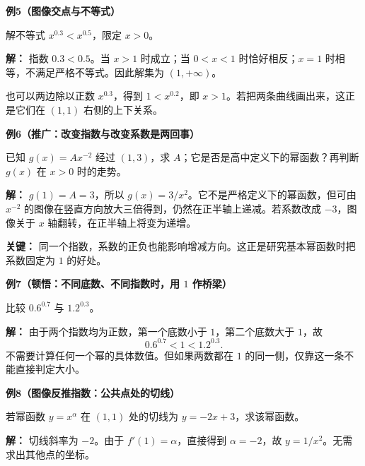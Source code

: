 \clearpage
\begin{examplebox}
\textbf{\textcolor{CExample}{例5（图像交点与不等式）}}



  解不等式 $x^{0.3}<x^{0.5}$，限定 $x>0$。

  \textbf{解：} 指数 $0.3<0.5$。当 $x>1$ 时成立；当 $0<x<1$ 时恰好相反；$x=1$ 时相等，不满足严格不等式。因此解集为 $(1,+\infty)$。

  也可以两边除以正数 $x^{0.3}$，得到 $1<x^{0.2}$，即 $x>1$。若把两条曲线画出来，这正是它们在 $(1,1)$ 右侧的上下关系。

  \medskip
  
\end{examplebox}
\clearpage
\begin{examplebox}
\textbf{\textcolor{CExample}{例6（推广：改变指数与改变系数是两回事）}}



  已知 $g(x)=Ax^{-2}$ 经过 $(1,3)$，求 $A$；它是否是高中定义下的幂函数？再判断 $g(x)$ 在 $x>0$ 时的走势。

  \textbf{解：} $g(1)=A=3$，所以 $g(x)=3/x^2$。它不是严格定义下的幂函数，但可由 $x^{-2}$ 的图像在竖直方向放大三倍得到，仍然在正半轴上递减。若系数改成 $-3$，图像关于 $x$ 轴翻转，在正半轴上将变为递增。

  \textbf{关键：} 同一个指数，系数的正负也能影响增减方向。这正是研究基本幂函数时把系数固定为 $1$ 的好处。

  \medskip
  
\end{examplebox}
\clearpage
\begin{examplebox}
\textbf{\textcolor{CExample}{例7（顿悟：不同底数、不同指数时，用 $1$ 作桥梁）}}



  比较 $0.6^{0.7}$ 与 $1.2^{0.3}$。

  \textbf{解：} 由于两个指数均为正数，第一个底数小于 $1$，第二个底数大于 $1$，故
  \[
      0.6^{0.7}<1<1.2^{0.3}.
  \]
  不需要计算任何一个幂的具体数值。但如果两数都在 $1$ 的同一侧，仅靠这一条不能直接判定大小。
  \medskip
  
\end{examplebox}
\clearpage
\begin{examplebox}
\textbf{\textcolor{CExample}{例8（图像反推指数：公共点处的切线）}}



  若幂函数 $y=x^\alpha$ 在 $(1,1)$ 处的切线为 $y=-2x+3$，求该幂函数。

  \textbf{解：} 切线斜率为 $-2$。由于 $f'(1)=\alpha$，直接得到 $\alpha=-2$，故 $y=1/x^2$。无需求出其他点的坐标。
\end{examplebox}
